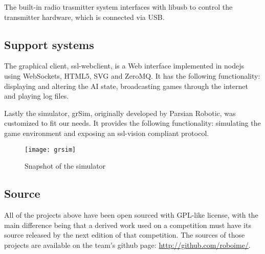 The built-in radio trasmitter system interfaces with libusb to control the transmitter hardware, which is connected via USB.


\subsection{Support systems}

The graphical client, ssl-webclient, is a Web interface implemented in nodejs using WebSockets, HTML5, SVG and ZeroMQ.
It has the following functionality: displaying and altering the AI state, broadcasting games through the internet and playing log files.

Lastly the simulator, grSim, originally developed by Parsian Robotic, was customized to fit our needs.
It provides the following functionality: simulating the game environment and exposing an ssl-vision compliant protocol.

\begin{figure}[H]
     \centering
     \texttt{[image: grsim]}
     \caption{Snapshot of the simulator}
     \label{simulatorSnapshot}
\end{figure}

\subsection{Source}

All of the projects above have been open sourced with GPL-like license, with the main difference being that a derived work used on a competition must have its source released by the next edition of that competition. The sources of those projects are available on the team's github page: \url{http://github.com/roboime/}.
